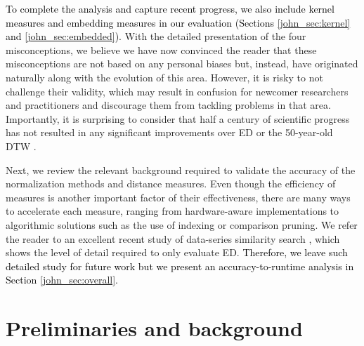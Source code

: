 \documentclass[11pt]{article}
\begin{document}
\textcolor{black}{To complete the analysis and capture recent progress, we also include kernel measures and embedding measures in our evaluation (Sections \ref{john_sec:kernel} and \ref{john_sec:embedded})}. With the detailed presentation of the four misconceptions, we believe we have now convinced the reader that these misconceptions are not based on any personal biases but, instead, have originated naturally along with the evolution of this area. However, it is risky to not challenge their validity, which may result in confusion for newcomer researchers and practitioners and discourage them from tackling problems in that area. Importantly, it is surprising to consider that half a century of scientific progress has not resulted in any significant improvements over ED or the 50-year-old DTW \cite{sakoe1971dynamic}.

Next, we review the relevant background required to validate the accuracy of the normalization methods and distance measures. Even though the efficiency of measures is another important factor of their effectiveness, there are many ways to accelerate each measure, ranging from hardware-aware implementations to algorithmic solutions such as the use of indexing or comparison pruning. We refer the reader to an excellent recent study of data-series similarity search \cite{echihabi2018lernaean}, which shows the level of detail required to only evaluate ED. \textcolor{black}{Therefore, we leave such detailed study for future work but we present an accuracy-to-runtime analysis in Section \ref{john_sec:overall}.}

\vspace*{-0.1cm}
\section{Preliminaries and background}
\label{john_sec:preliminaries}
\end{document}
